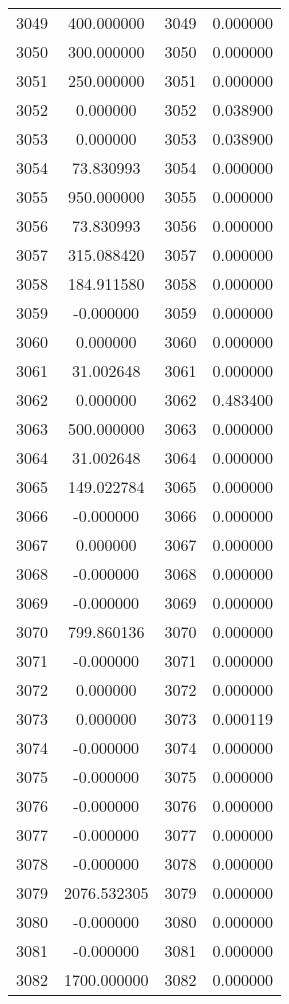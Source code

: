 \documentclass[12pt]{article}
\begin{document}
\begin{longtable}{@{}cccc@{}}
3049 & 400.000000 & 3049 & 0.000000 \\
3050 & 300.000000 & 3050 & 0.000000 \\
3051 & 250.000000 & 3051 & 0.000000 \\
3052 & 0.000000 & 3052 & 0.038900 \\
3053 & 0.000000 & 3053 & 0.038900 \\
3054 & 73.830993 & 3054 & 0.000000 \\
3055 & 950.000000 & 3055 & 0.000000 \\
3056 & 73.830993 & 3056 & 0.000000 \\
3057 & 315.088420 & 3057 & 0.000000 \\
3058 & 184.911580 & 3058 & 0.000000 \\
3059 & -0.000000 & 3059 & 0.000000 \\
3060 & 0.000000 & 3060 & 0.000000 \\
3061 & 31.002648 & 3061 & 0.000000 \\
3062 & 0.000000 & 3062 & 0.483400 \\
3063 & 500.000000 & 3063 & 0.000000 \\
3064 & 31.002648 & 3064 & 0.000000 \\
3065 & 149.022784 & 3065 & 0.000000 \\
3066 & -0.000000 & 3066 & 0.000000 \\
3067 & 0.000000 & 3067 & 0.000000 \\
3068 & -0.000000 & 3068 & 0.000000 \\
3069 & -0.000000 & 3069 & 0.000000 \\
3070 & 799.860136 & 3070 & 0.000000 \\
3071 & -0.000000 & 3071 & 0.000000 \\
3072 & 0.000000 & 3072 & 0.000000 \\
3073 & 0.000000 & 3073 & 0.000119 \\
3074 & -0.000000 & 3074 & 0.000000 \\
3075 & -0.000000 & 3075 & 0.000000 \\
3076 & -0.000000 & 3076 & 0.000000 \\
3077 & -0.000000 & 3077 & 0.000000 \\
3078 & -0.000000 & 3078 & 0.000000 \\
3079 & 2076.532305 & 3079 & 0.000000 \\
3080 & -0.000000 & 3080 & 0.000000 \\
3081 & -0.000000 & 3081 & 0.000000 \\
3082 & 1700.000000 & 3082 & 0.000000 \\

\end{longtable}
\end{document}
